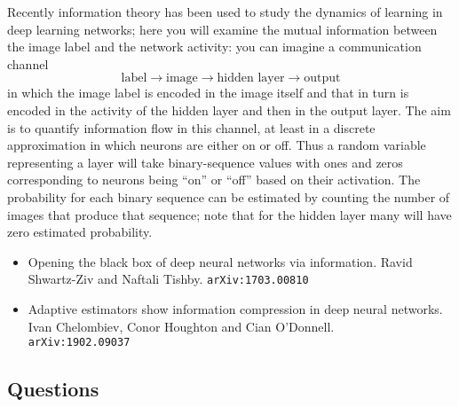 \documentclass[12pt]{article}
\begin{document}
Recently information theory has been used to study the dynamics of
learning in deep learning networks; here you will examine the mutual
information between the image label and the network activity: you can
imagine a communication channel
$$
 \mbox{label} \rightarrow \mbox{image} \rightarrow \mbox{hidden layer} \rightarrow \mbox{output}
$$
 in which the image label is encoded in the image itself and that in
turn is encoded in the activity of the hidden layer and then in the
output layer. The aim is to quantify information flow in this channel,
at least in a discrete approximation in which neurons are either on or
off. Thus a random variable representing a layer will take
binary-sequence values with ones and zeros corresponding to neurons
being “on” or “off” based on their activation. The probability for
each binary sequence can be estimated by counting the number of images
that produce that sequence; note that for the hidden layer many will
have zero estimated probability.

\begin{itemize}
\item Opening the black box of deep neural networks via information. Ravid Shwartz-Ziv and Naftali Tishby. \texttt{arXiv:1703.00810}
\item Adaptive estimators show information compression in deep neural networks. Ivan Chelombiev, Conor Houghton and Cian O'Donnell.\\ \texttt{arXiv:1902.09037}
\end{itemize}

 \subsection*{Questions }
\end{document}
